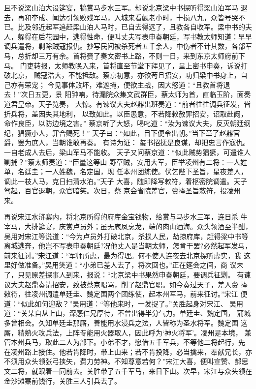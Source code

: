 且不说梁山泊大设筵宴，犒赏马步水三军。却说北京梁中书探听得梁山泊军马
退去，再和李成、闻达引领败残军马，入城来看觑老小时，十损八九，众皆号哭不
已。比及邻近起军追赶梁山泊人马时，已自去得远了，且教各自收军。梁中书的夫
人，躲得在后花园中，逃得性命，便叫丈夫写表申奏朝廷，写书教太师知道：早早
调兵遣将，剿除贼寇报仇。抄写民间被杀死者五千余人，中伤者不计其数，各部军
马，总折却三万有余。首将赍了奏文密书上路，不则一日，来到东京太师府前下马。
门吏转报，太师教唤入来，首将直至节堂下拜见了，呈上密书申奏，诉说打破北京，
贼寇浩大，不能抵敌。蔡京初意，亦欲苟且招安，功归梁中书身上，自己亦有荣宠；
今见事体败坏，难遮掩，便欲主战，因大怒道：“且教首将退去！”次日五更，景
阳钟响，待漏院众集文武群臣，蔡太师为首，直临玉阶，面奏道君皇帝。天子览奏，
大惊。有谏议大夫赵鼎出班奏道：“前者往往调兵征发，皆折兵将，盖因失其地利，
以致如此。以臣愚意，不若降敕赦罪招安，诏取赴阙，命作良臣，以防边境之害。”
蔡京听了大怒，喝叱道：“汝为谏议大夫，反灭朝廷纲纪，猖獗小人，罪合赐死！”
天子曰：“如此，目下便令出朝。”当下革了赵鼎官爵，罢为庶人，当朝谁敢再奏。
有诗为证：
玺书招抚是良谋，却把忠言作寇仇。
一自老成人去后，梁山军马不能收。
天子又问蔡京道：“似此贼势猖獗，可遣谁人剿捕？”蔡太师奏道：“臣量这等山
野草贼，安用大军，臣举凌州有二将：一人姓单，名廷圭；一人姓魏，名定国，现
任本州团练使。伏乞陛下圣旨，星夜差人，调此一枝人马，克日扫清水泊。”天子
大喜，随即降写敕符，着枢密院调遣。天子驾起，百官退朝，众官暗笑。次日，蔡
京会省院差官，赍捧圣旨敕符，投凌州来。

再说宋江水浒寨内，将北京所得的府库金宝钱物，给赏与马步水三军，连日杀
牛宰马，大排筵宴，庆赏卢员外；虽无庖凤烹龙，端的肉山酒海。众头领酒至半酣，
吴用对宋江等说道：“今为卢员外打破北京，杀损人民，劫掠府库，赶得梁中书等
离城逃奔，他岂不写表申奏朝廷?况他丈人是当朝太师，怎肯干罢?必然起军发马，
前来征讨。”宋江道：“军师所虑，最为得理。何不使人连夜去北京探听虚实，我
这里好做准备。”吴用笑道：“小弟已差人去了，将次回也。”正在筵会之间，商
议未了，只见原差探事人到来，报说：“北京梁中书果然申奏朝廷，要调兵征剿。
有谏议大夫赵鼎奏请招安，致被蔡京喝骂，削了赵鼎官职。如今奏过天子，差人赍
捧敕符，往凌州调遣单廷圭、魏定国两个团练使，起本州军马，前来征讨。”宋江
便道：“似此如何迎敌？”吴用道：“等他来时，一发捉了。”关胜起身对宋江、
吴用道：“关某自从上山，深感仁兄厚待，不曾出得半分气力。单廷圭、魏定国，
蒲城多曾相会。久知单廷圭那厮，善能用水浸兵之法，人皆称为圣水将军。魏定国
这厮，精熟火攻兵法，上阵专能用火器取人，因此呼为‘神火将军’。凌州是本境，
兼管本州兵马，取此二人为部下。小弟不才，愿借五千军兵，不等他二将起行，先
在凌州路上接住。他若肯降时，带上山来；若不肯投降，必当擒来，奉献兄长，亦
不须用众头领张弓挟矢，费力劳神。不知尊意若何？”宋江大喜，便叫宣赞、郝思
文二将，就跟着一同前去。关胜带了五千军马，来日下山。次早，宋江与众头领在
金沙滩寨前饯行，关胜三人引兵去了。

